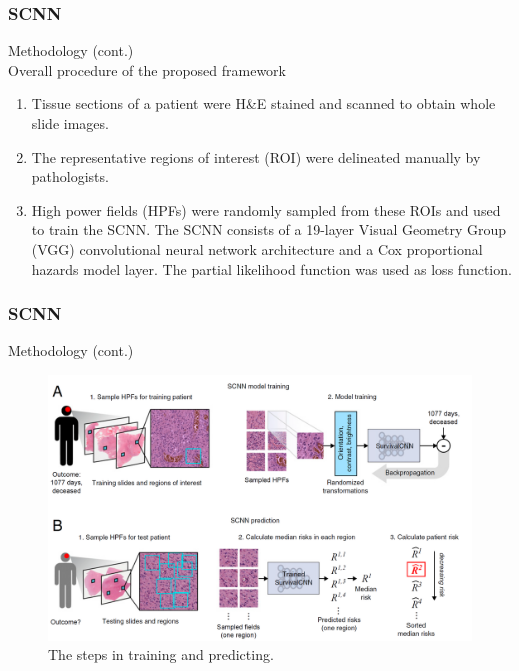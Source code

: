 \documentclass{beamer}
\begin{document}
	\begin{frame}
		\frametitle{SCNN}
		Methodology (cont.)\\
		\vspace{5mm}
		Overall procedure of the proposed framework
		\begin{enumerate}[A]
			\item Tissue sections of a patient were H\&E stained and scanned to obtain whole slide images.
			\item The representative regions of interest (ROI) were delineated manually by pathologists. 
			\item High power fields (HPFs) were randomly sampled from these ROIs and used to train the SCNN. The SCNN consists of a 19-layer Visual Geometry Group (VGG) convolutional neural network architecture and a Cox proportional hazards model layer. The partial likelihood function was used as loss function.
		\end{enumerate}
	\end{frame}

	\begin{frame}
		\frametitle{SCNN}
		Methodology (cont.)
		
		\begin{figure}[H]
			\centering
			\includegraphics[scale=0.12]{figures/scnn-train-pred.png}
			\caption{The steps in training and predicting.}
			\label{fig:scnn-overall}
		\end{figure}
	\end{frame}
	
\end{document}
